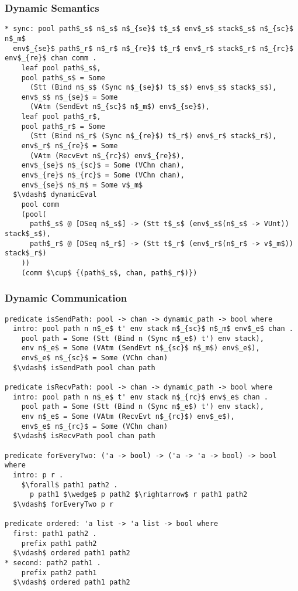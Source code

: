 \documentclass{beamer}
\begin{document}
\begin{frame}[fragile]
	\frametitle{Dynamic Semantics}
\begin{lstlisting}[language=logic, mathescape]
* sync: pool path$_s$ n$_s$ n$_{se}$ t$_s$ env$_s$ stack$_s$ n$_{sc}$ n$_m$
  env$_{se}$ path$_r$ n$_r$ n$_{re}$ t$_r$ env$_r$ stack$_r$ n$_{rc}$ env$_{re}$ chan comm .
    leaf pool path$_s$,
    pool path$_s$ = Some
      (Stt (Bind n$_s$ (Sync n$_{se}$) t$_s$) env$_s$ stack$_s$),
    env$_s$ n$_{se}$ = Some
      (VAtm (SendEvt n$_{sc}$ n$_m$) env$_{se}$),
    leaf pool path$_r$,
    pool path$_r$ = Some
      (Stt (Bind n$_r$ (Sync n$_{re}$) t$_r$) env$_r$ stack$_r$),
    env$_r$ n$_{re}$ = Some
      (VAtm (RecvEvt n$_{rc}$) env$_{re}$),
    env$_{se}$ n$_{sc}$ = Some (VChn chan),
    env$_{re}$ n$_{rc}$ = Some (VChn chan), 
    env$_{se}$ n$_m$ = Some v$_m$
  $\vdash$ dynamicEval
    pool comm
    (pool(
      path$_s$ @ [DSeq n$_s$] -> (Stt t$_s$ (env$_s$(n$_s$ -> VUnt)) stack$_s$), 
      path$_r$ @ [DSeq n$_r$] -> (Stt t$_r$ (env$_r$(n$_r$ -> v$_m$)) stack$_r$)
    )) 
    (comm $\cup$ {(path$_s$, chan, path$_r$)})
\end{lstlisting}
\end{frame}

\begin{frame}[fragile]
	\frametitle{Dynamic Communication}
\begin{lstlisting}[language=logic, mathescape]
predicate isSendPath: pool -> chan -> dynamic_path -> bool where
  intro: pool path n n$_e$ t' env stack n$_{sc}$ n$_m$ env$_e$ chan .
    pool path = Some (Stt (Bind n (Sync n$_e$) t') env stack),
    env n$_e$ = Some (VAtm (SendEvt n$_{sc}$ n$_m$) env$_e$), 
    env$_e$ n$_{sc}$ = Some (VChn chan)
  $\vdash$ isSendPath pool chan path

predicate isRecvPath: pool -> chan -> dynamic_path -> bool where
  intro: pool path n n$_e$ t' env stack n$_{rc}$ env$_e$ chan .
    pool path = Some (Stt (Bind n (Sync n$_e$) t') env stack),
    env n$_e$ = Some (VAtm (RecvEvt n$_{rc}$) env$_e$),
    env$_e$ n$_{rc}$ = Some (VChn chan)
  $\vdash$ isRecvPath pool chan path

predicate forEveryTwo: ('a -> bool) -> ('a -> 'a -> bool) -> bool where
  intro: p r .
    $\forall$ path1 path2 .
      p path1 $\wedge$ p path2 $\rightarrow$ r path1 path2
  $\vdash$ forEveryTwo p r

predicate ordered: 'a list -> 'a list -> bool where
  first: path1 path2 .
    prefix path1 path2
  $\vdash$ ordered path1 path2
* second: path2 path1 .
    prefix path2 path1
  $\vdash$ ordered path1 path2
\end{lstlisting}
\end{frame}
\end{document}
